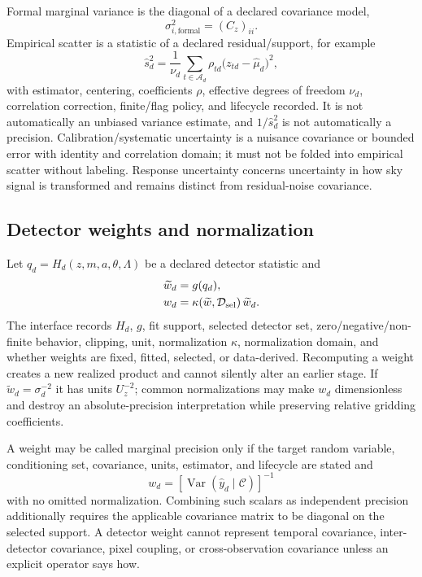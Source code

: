 \documentclass[11pt]{article}
\newcommand{\Var}{\operatorname{Var}}
\begin{document}
Formal marginal variance is the diagonal of a declared covariance model,
\begin{equation}
 \sigma^2_{i,\mathrm{formal}}=(C_z)_{ii}.
 \label{eq:formal-variance}
\end{equation}
Empirical scatter is a statistic of a declared residual/support, for example
\begin{equation}
 \widehat s_d^2=
 \frac{1}{\nu_d}\sum_{t\in\mathcal A_d}
   \rho_{td}\bigl(z_{td}-\widehat\mu_d\bigr)^2,
 \label{eq:empirical-scatter}
\end{equation}
with estimator, centering, coefficients $\rho$, effective degrees of freedom
$\nu_d$, correlation correction, finite/flag policy, and lifecycle recorded.
It is not automatically an unbiased variance estimate, and $1/\widehat s_d^2$
is not automatically a precision.  Calibration/systematic uncertainty is a
nuisance covariance or bounded error with identity and correlation domain; it
must not be folded into empirical scatter without labeling.  Response
uncertainty concerns uncertainty in how sky signal is transformed and remains
distinct from residual-noise covariance.

\subsection{Detector weights and normalization}

Let $q_d=H_d(z,m,a,\theta,\Lambda)$ be a declared detector statistic and
\begin{align}
 \widetilde w_d &= g(q_d),
   \label{eq:raw-detector-weight}\\
 w_d &= \kappa(\widetilde w,\mathcal D_{\rm sel})\,\widetilde w_d.
   \label{eq:normalized-detector-weight}
\end{align}
The interface records $H_d$, $g$, fit support, selected detector set,
zero/negative/non-finite behavior, clipping, unit, normalization $\kappa$,
normalization domain, and whether weights are fixed, fitted, selected, or
data-derived.  Recomputing a weight creates a new realized product and cannot
silently alter an earlier stage.  If $\widetilde w_d=\sigma_d^{-2}$ it has
units $U_z^{-2}$; common normalizations may make $w_d$ dimensionless and
destroy an absolute-precision interpretation while preserving relative
gridding coefficients.

A weight may be called marginal precision only if the target random variable,
conditioning set, covariance, units, estimator, and lifecycle are stated and
\begin{equation}
 w_d=\left[\Var(\widehat y_d\mid\mathcal C)\right]^{-1}
 \label{eq:marginal-precision}
\end{equation}
with no omitted normalization.  Combining such scalars as independent
precision additionally requires the applicable covariance matrix to be
diagonal on the selected support.  A detector weight cannot represent
temporal covariance, inter-detector covariance, pixel coupling, or
cross-observation covariance unless an explicit operator says how.
\end{document}
